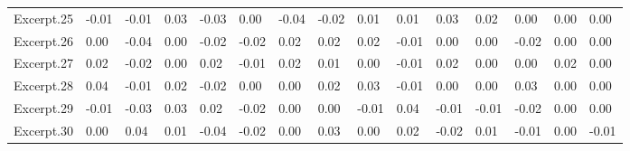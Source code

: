 \documentclass[
]{article}
\newenvironment{lltable}{\begin{landscape}\begin{center}\begin{ThreePartTable}}{\end{ThreePartTable}\end{center}\end{landscape}}
\begin{document}
\begin{lltable}
{\begin{longtable}{lllllllllllllll}
Excerpt.25 & -0.01 & -0.01 & 0.03 & -0.03 & 0.00 & -0.04 & -0.02 & 0.01 & 0.01 & 0.03 & 0.02 & 0.00 & 0.00 & 0.00\\
Excerpt.26 & 0.00 & -0.04 & 0.00 & -0.02 & -0.02 & 0.02 & 0.02 & 0.02 & -0.01 & 0.00 & 0.00 & -0.02 & 0.00 & 0.00\\
Excerpt.27 & 0.02 & -0.02 & 0.00 & 0.02 & -0.01 & 0.02 & 0.01 & 0.00 & -0.01 & 0.02 & 0.00 & 0.00 & 0.02 & 0.00\\
Excerpt.28 & 0.04 & -0.01 & 0.02 & -0.02 & 0.00 & 0.00 & 0.02 & 0.03 & -0.01 & 0.00 & 0.00 & 0.03 & 0.00 & 0.00\\
Excerpt.29 & -0.01 & -0.03 & 0.03 & 0.02 & -0.02 & 0.00 & 0.00 & -0.01 & 0.04 & -0.01 & -0.01 & -0.02 & 0.00 & 0.00\\
Excerpt.30 & 0.00 & 0.04 & 0.01 & -0.04 & -0.02 & 0.00 & 0.03 & 0.00 & 0.02 & -0.02 & 0.01 & -0.01 & 0.00 & -0.01\\
\bottomrule
\end{longtable}

}

\end{lltable}
\end{document}
